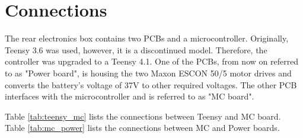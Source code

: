 \section{Connections}

The rear electronics box contains two PCBs and a microcontroller. Originally, Teensy 3.6 was used, however, it is a discontinued model. Therefore, the controller was upgraded to a Teensy 4.1. One of the PCBs, from now on referred to as "Power board", is housing the two Maxon ESCON 50/5 motor drives and converts the battery's voltage of 37V to other required voltages. The other PCB interfaces with the microcontroller and is referred to as "MC board".

Table \ref{tab:teensy_mc} lists the connections between Teensy and MC board. Table \ref{tab:mc_power} lists the connections between MC and Power boards.

